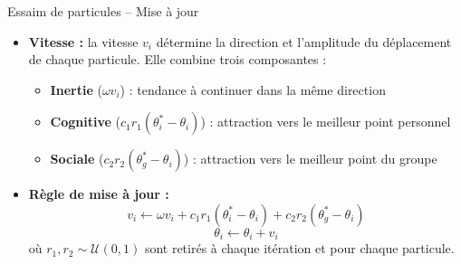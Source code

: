 \documentclass[11pt,aspectratio=169]{beamer}
\begin{document}
\begin{frame}{Essaim de particules -- Mise à jour}

\begin{itemize}

\item \textbf{Vitesse :} la vitesse $v_i$ détermine la direction et l'amplitude du déplacement de chaque particule. Elle combine trois composantes :
  \begin{itemize}
    \item \textbf{Inertie} ($\omega v_i$) : tendance à continuer dans la même direction\newline
    \item \textbf{Cognitive} ($c_1 r_1 (\theta_i^* - \theta_i)$) : attraction vers le meilleur point personnel\newline
    \item \textbf{Sociale} ($c_2 r_2 (\theta_g^* - \theta_i)$) : attraction vers le meilleur point du groupe\newline
  \end{itemize}

\item \textbf{Règle de mise à jour :}
  \[
  \boxed{v_i \leftarrow \omega v_i + c_1 r_1 (\theta_i^* - \theta_i) + c_2 r_2 (\theta_g^* - \theta_i)}
  \]
  \[
  \theta_i \leftarrow \theta_i + v_i
  \]
  où $r_1, r_2 \sim \mathcal{U}(0,1)$ sont retirés à chaque itération et pour chaque particule.

\end{itemize}

\end{frame}
\end{document}
